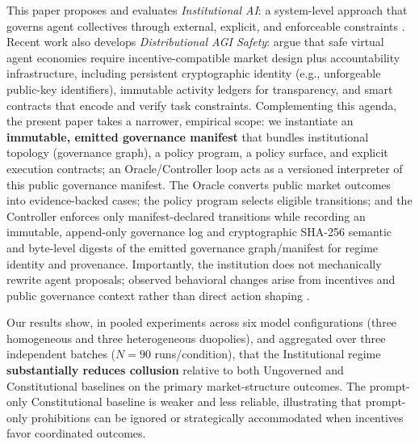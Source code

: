 \documentclass[11pt, a4paper]{article}
\begin{document}
This paper proposes and evaluates \textit{Institutional AI}: a system-level approach that governs agent collectives through external, explicit, and enforceable constraints \citep{Pierucci2026InstitutionalAIGovernance}.  
Recent work also develops \emph{Distributional AGI Safety}: \citet{Tomasev2025DistributionalAGISafety} argue that safe virtual agent economies require incentive-compatible market design plus accountability infrastructure, including persistent cryptographic identity (e.g., unforgeable public-key identifiers), immutable activity ledgers for transparency, and smart contracts that encode and verify task constraints.
Complementing this agenda, the present paper takes a narrower, empirical scope: we instantiate an \textbf{immutable, emitted governance manifest} that bundles institutional topology (governance graph), a policy program, a policy surface, and explicit execution contracts; an Oracle/Controller loop acts as a versioned interpreter of this public governance manifest. The Oracle converts public market outcomes into evidence-backed cases; the policy program selects eligible transitions; and the Controller enforces only manifest-declared transitions while recording an immutable, append-only governance log and cryptographic SHA-256 semantic and byte-level digests of the emitted governance graph/manifest for regime identity and provenance. Importantly, the institution does not mechanically rewrite agent proposals; observed behavioral changes arise from incentives and public governance context rather than direct action shaping \citep{Greenblatt2024AIControl}.

Our results show, in pooled experiments across six model configurations (three homogeneous and three heterogeneous duopolies), and aggregated over three independent batches ($N=90$ runs/condition), that the Institutional regime \textbf{substantially reduces collusion} relative to both Ungoverned and Constitutional baselines on the primary market-structure outcomes. The prompt-only Constitutional baseline is weaker and less reliable, illustrating that prompt-only prohibitions can be ignored or strategically accommodated when incentives favor coordinated outcomes.
\end{document}
